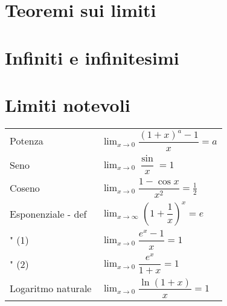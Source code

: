 \section{Teoremi sui limiti}
\begin{theorem}\label{thm:comparison}
\end{theorem}

\section{Infiniti e infinitesimi}

\section{Limiti notevoli}
\begin{center}
\begin{tabular}{ll}
    Potenza            & $\displaystyle\lim_{x \rightarrow 0} \dfrac{(1+x)^a - 1}{x} = a$ \\
    Seno               & $\displaystyle\lim_{x \rightarrow 0} \dfrac{\sin}{x} = 1$ \\
    Coseno             & $\displaystyle\lim_{x \rightarrow 0} \dfrac{1 - \cos x}{x^2} = \frac{1}{2}$ \\
    Esponenziale - def & $\displaystyle\lim_{x \rightarrow \infty} \left( 1 + \dfrac{1}{x} \right)^x = e$ \\
    \qquad " \qquad (1)& $\displaystyle\lim_{x \rightarrow 0} \dfrac{e^x - 1}{x} = 1$ \\
    \qquad " \qquad (2)& $\displaystyle\lim_{x \rightarrow 0} \dfrac{e^{x}}{1+x} = 1$ \\
    Logaritmo naturale & $\displaystyle\lim_{x \rightarrow 0} \dfrac{\ln (1+x)}{x} = 1$ \\
\end{tabular}
\end{center}

